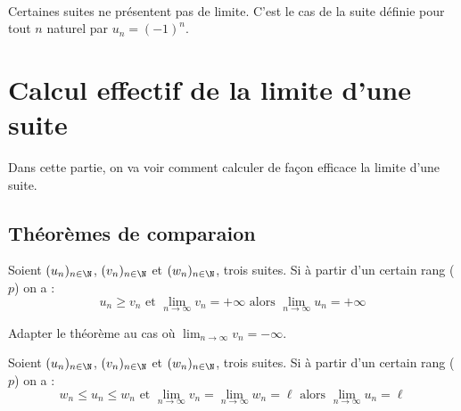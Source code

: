 \documentclass[12pt,a4paper,frenchb]{article}
\begin{document}
\begin{remarque}~\\
  Certaines suites ne présentent pas de limite. C'est le cas de la suite
  définie pour tout $n$ naturel par $u_n = (-1)^n$.
\end{remarque}

\section{Calcul effectif de la limite d'une suite}

Dans cette partie, on va voir comment calculer de façon efficace la
limite d'une suite.

\subsection{Théorèmes de comparaion}

\begin{theoreme}
  Soient $(u_n)_{n\in\N}$, $(v_n)_{n\in\N}$ et $(w_n)_{n\in\N}$, trois
  suites. Si à partir d'un certain rang ($p$) on a : \[ u_n \geq v_n
    \text{ et } \lim_{n\to\infty} v_n = +\infty \text{ alors }
  \lim_{n\to\infty} u_n = +\infty \]
\end{theoreme}


\begin{exercice}
  Adapter le théorème au cas où $\lim_{n\to\infty} v_n = -\infty$.

\end{exercice}

\begin{theoreme}
  Soient $(u_n)_{n\in\N}$, $(v_n)_{n\in\N}$ et $(w_n)_{n\in\N}$, trois
  suites. Si à partir d'un certain rang ($p$) on a : \[ w_n \leq u_n
    \leq w_n \text{ et } \lim_{n\to\infty} v_n = \lim_{n\to\infty}w_n =
  \ell \text{ alors } \lim_{n\to\infty} u_n = \ell \]
\end{theoreme}
\end{document}
